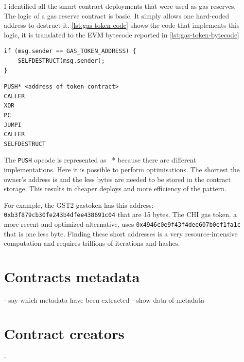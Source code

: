 I identified all the smart contract deployments that were used as gas reserves. The logic of a gas reserve contract is basic. It simply allows one hard-coded address to destruct it. \cref{lst:gas-token-code} shows the code that implements this logic, it is translated to the EVM bytecode reported in \cref{lst:gas-token-bytecode}

\begin{lstlisting}[caption={Pseudo code of the gas reserves.},label={lst:gas-token-code},captionpos=b,numbers=none]
if (msg.sender == GAS_TOKEN_ADDRESS) {
    SELFDESTRUCT(msg.sender);
}
\end{lstlisting}

\begin{lstlisting}[caption={EVM bytecode of the gas reserves.},label={lst:gas-token-bytecode},captionpos=b,numbers=none]
PUSH* <address of token contract>
CALLER
XOR
PC
JUMPI
CALLER
SELFDESTRUCT
\end{lstlisting}

The {\tt PUSH} opcode is represented as {\ *} because there are different implementations. Here it is possible to perform optimisations. The shortest the owner’s address is and the less bytes are needed to be stored in the contract storage. This results in cheaper deploys and more efficiency of the pattern.

For example, the GST2 gastoken has this address: {\tt 0xb3f879cb30fe243b4dfee438691c04} that are 15 bytes. The CHI gas token, a more recent and optimized alternative, uses {\tt 0x4946c0e9f43f4dee607b0ef1fa1c} that is one less byte. Finding these short addresses is a very resource-intensive computation and requires trillions of iterations and hashes.


\section{Contracts metadata}

- say which metadata have been extracted
- show data of metadata


\section{Contract creators}

- 
